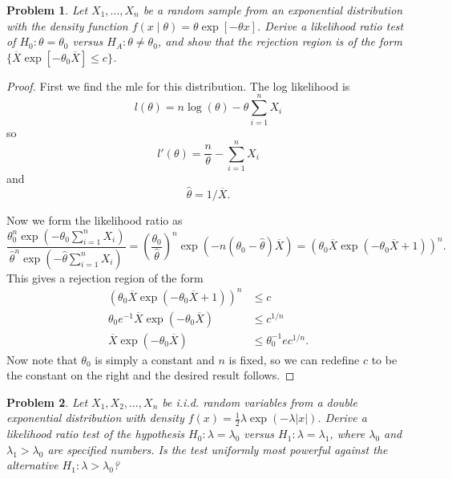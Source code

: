 \documentclass{article}
\newtheorem{problem}{Problem}
\begin{document}
\begin{problem}
Let $X_1, \dots , X_n$ be a random sample from an exponential distribution with the density function $f(x \mid \theta) = \theta \exp[-\theta x]$. Derive a likelihood ratio test of $H_0 : \theta = \theta_0$ versus $H_A : \theta \neq \theta_0$, and show that the rejection region is of the form $\{\overline{X} \exp[-\theta_0 \overline{X}] \leq c\}$.
\end{problem}
\begin{proof}
First we find the mle for this distribution. The log likelihood is
\[
l(\theta) = n \log(\theta) - \theta \sum_{i=1}^n X_i
\]
so
\[
l'(\theta) = \frac{n}{\theta} - \sum_{i=1}^n X_i
\]
and
\[
\hat{\theta} = 1/\overline{X}.
\]

Now we form the likelihood ratio as
\[
\frac{\theta_0^n \exp \left ( -\theta_0 \sum_{i=1}^n X_i \right )}{\hat{\theta}^n \exp \left ( -\hat{\theta} \sum_{i=1}^n X_i \right )} = \left ( \frac{\theta_0}{\hat{\theta}} \right )^n \exp \left ( -n(\theta_0 - \hat{\theta}) \overline{X} \right ) = (\theta_0 \overline{X} \exp (-\theta_0\overline{X} + 1))^n.
\]
This gives a rejection region of the form
\begin{align*}
(\theta_0 \overline{X} \exp (-\theta_0\overline{X} + 1))^n &\leq c\\
\theta_0e^{-1}\overline{X} \exp (-\theta_0\overline{X}) & \leq c^{1/n}\\
\overline{X} \exp (-\theta_0\overline{X}) &\leq \theta_0^{-1}ec^{1/n}.
\end{align*}
Now note that $\theta_0$ is simply a constant and $n$ is fixed, so we can redefine $c$ to be the constant on the right and the desired result follows.
\end{proof}

\begin{problem}
Let $X_1, X_2, \dots , X_n$ be i.i.d. random variables from a double exponential distribution with density $f(x) = \frac{1}{2} \lambda \exp (-\lambda|x|)$. Derive a likelihood ratio test of the hypothesis $H_0 : \lambda = \lambda_0$ versus $H_1 : \lambda = \lambda_1$, where $\lambda_0$ and $\lambda_1 > \lambda_0$ are specified numbers. Is the test uniformly most powerful against the alternative $H_1 : \lambda > \lambda_0$?
\end{problem}
\end{document}
